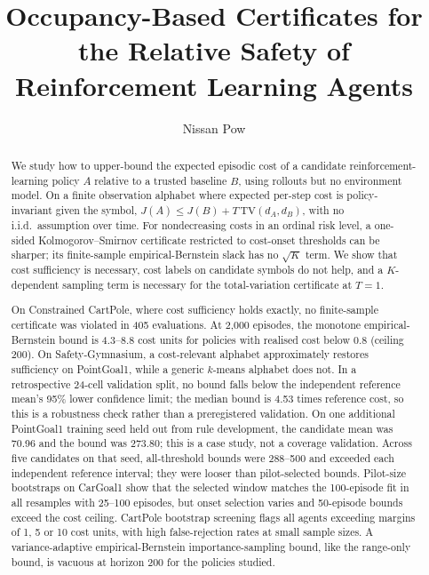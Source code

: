 \documentclass{article}
\title{Occupancy-Based Certificates for the Relative Safety of Reinforcement Learning Agents}
\author{Nissan Pow}
\newcommand{\TV}{\mathrm{TV}}
\begin{document}
\maketitle

\begin{abstract}
We study how to upper-bound the expected episodic cost of a candidate reinforcement-learning policy $A$ relative to a trusted baseline $B$, using rollouts but no environment model. On a finite observation alphabet where expected per-step cost is policy-invariant given the symbol, $J(A)\le J(B)+T\,\TV(d_A,d_B)$, with no i.i.d.\ assumption over time. For nondecreasing costs in an ordinal risk level, a one-sided Kolmogorov--Smirnov certificate restricted to cost-onset thresholds can be sharper; its finite-sample empirical-Bernstein slack has no $\sqrt K$ term. We show that cost sufficiency is necessary, cost labels on candidate symbols do not help, and a $K$-dependent sampling term is necessary for the total-variation certificate at $T=1$.

On Constrained CartPole, where cost sufficiency holds exactly, no finite-sample certificate was violated in 405 evaluations. At 2,000 episodes, the monotone empirical-Bernstein bound is 4.3--8.8 cost units for policies with realised cost below 0.8 (ceiling 200). On Safety-Gymnasium, a cost-relevant alphabet approximately restores sufficiency on PointGoal1, while a generic $k$-means alphabet does not. In a retrospective 24-cell validation split, no bound falls below the independent reference mean's 95\% lower confidence limit; the median bound is 4.53 times reference cost, so this is a robustness check rather than a preregistered validation. On one additional PointGoal1 training seed held out from rule development, the candidate mean was 70.96 and the bound was 273.80; this is a case study, not a coverage validation. Across five candidates on that seed, all-threshold bounds were 288--500 and exceeded each independent reference interval; they were looser than pilot-selected bounds. Pilot-size bootstraps on CarGoal1 show that the selected window matches the 100-episode fit in all resamples with 25--100 episodes, but onset selection varies and 50-episode bounds exceed the cost ceiling. CartPole bootstrap screening flags all agents exceeding margins of 1, 5 or 10 cost units, with high false-rejection rates at small sample sizes. A variance-adaptive empirical-Bernstein importance-sampling bound, like the range-only bound, is vacuous at horizon 200 for the policies studied.
\end{abstract}
\end{document}
